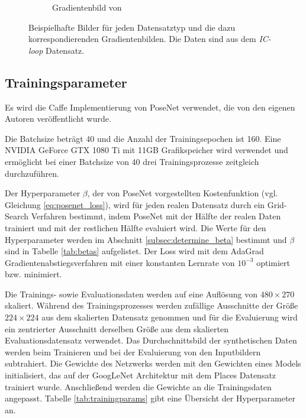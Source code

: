 \begin{figure}[H]
\begin{subfigure}[t]{0.24\linewidth}
		\caption{Gradientenbild  \hspace{1cm} von }
	\end{subfigure}
	\hfill
	\caption{Beispielhafte Bilder für jeden Datensatztyp und die dazu korrespondierenden Gradientenbilden. Die Daten sind aus dem \textit{IC-loop} Datensatz.}
	\label{fig:dataset_preprocess}
\end{figure}

\subsection{Trainingsparameter}
Es wird die Caffe Implementierung \cite{jiaCaffeConvolutionalArchitecture2014} von PoseNet verwendet, die von den eigenen Autoren \citet{kendallPoseNetConvolutionalNetwork2015} veröffentlicht wurde.

Die Batchsize beträgt 40 und die Anzahl der Trainingsepochen ist 160. Eine NVIDIA GeForce GTX 1080 Ti mit 11GB Grafikspeicher wird verwendet und ermöglicht bei einer Batchsize von 40 drei Trainingsprozesse zeitgleich durchzuführen.

Der Hyperparameter $\beta$, der von PoseNet vorgestellten Kostenfunktion (vgl. Gleichung \ref{eq:posenet_loss}), wird für jeden realen Datensatz durch ein Grid-Search Verfahren bestimmt, indem PoseNet mit der Hälfte der realen Daten trainiert und mit der restlichen Hälfte evaluiert wird. Die Werte für den Hyperparameter werden im Abschnitt \ref{subsec:determine_beta} bestimmt und $\beta$ sind in Tabelle \ref{tab:betas} aufgelistet. Der Loss wird mit dem AdaGrad \cite{duchiAdaptiveSubgradientMethods2011} Gradientenabstiegsverfahren mit einer konstanten Lernrate von $10^{-3}$ optimiert bzw. minimiert. 

Die Trainings- sowie Evaluationsdaten werden auf eine Auflösung von $480\times270$ skaliert. Während des Trainingsprozesses werden zufällige Ausschnitte der Größe $224 \times 224$ aus dem skalierten Datensatz genommen und für die Evaluierung wird ein zentrierter Ausschnitt derselben Größe aus dem skalierten Evaluationsdatensatz verwendet. Das Durchschnittsbild der synthetischen Daten werden beim Trainieren und bei der Evaluierung von den Inputbildern subtrahiert.
Die Gewichte des Netzwerks werden mit den Gewichten eines Models initialisiert, das auf der GoogLeNet Architektur mit dem Places Datensatz \cite{zhouLearningDeepFeatures2014} trainiert wurde. Anschließend werden die Gewichte an die Trainingsdaten angepasst. Tabelle \ref{tab:trainingparams} gibt eine Übersicht der Hyperparameter an.

